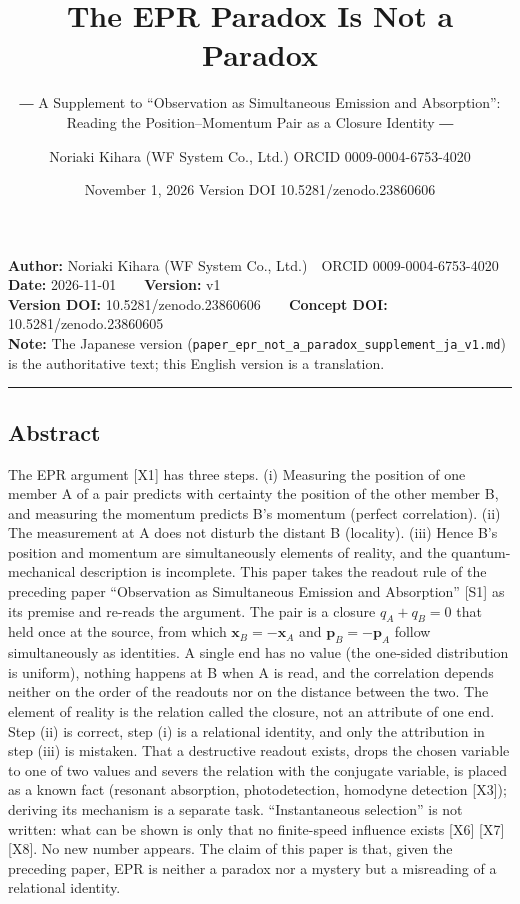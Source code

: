 \documentclass[
  a4paper,
]{article}
\title{The EPR Paradox Is Not a Paradox}
\subtitle{― A Supplement to ``Observation as Simultaneous Emission and
Absorption'': Reading the Position--Momentum Pair as a Closure Identity
―}
\author{Noriaki Kihara (WF System Co., Ltd.) ORCID 0009-0004-6753-4020}
\date{November 1, 2026 Version DOI 10.5281/zenodo.23860606}
\begin{document}
\maketitle

\textbf{Author:} Noriaki Kihara (WF System Co., Ltd.)　ORCID
0009-0004-6753-4020\\
\textbf{Date:} 2026-11-01　　\textbf{Version:} v1\\
\textbf{Version DOI:} 10.5281/zenodo.23860606　　\textbf{Concept DOI:}
10.5281/zenodo.23860605\\
\textbf{Note:} The Japanese version
(\texttt{paper\_\allowbreak{}epr\_\allowbreak{}not\_\allowbreak{}a\_\allowbreak{}paradox\_\allowbreak{}supplement\_\allowbreak{}ja\_\allowbreak{}v1.md}) is the
authoritative text; this English version is a translation.

\begin{center}\rule{0.5\linewidth}{0.5pt}\end{center}

\subsection{Abstract}\label{abstract}

The EPR argument {[}X1{]} has three steps. (i) Measuring the position of
one member A of a pair predicts with certainty the position of the other
member B, and measuring the momentum predicts B's momentum (perfect
correlation). (ii) The measurement at A does not disturb the distant B
(locality). (iii) Hence B's position and momentum are simultaneously
elements of reality, and the quantum-mechanical description is
incomplete. This paper takes the readout rule of the preceding paper
``Observation as Simultaneous Emission and Absorption'' {[}S1{]} as its
premise and re-reads the argument. The pair is a closure \(q_A+q_B=0\)
that held once at the source, from which
\(\boldsymbol{x}_B=-\boldsymbol{x}_A\) and
\(\boldsymbol{p}_B=-\boldsymbol{p}_A\) follow simultaneously as
identities. A single end has no value (the one-sided distribution is
uniform), nothing happens at B when A is read, and the correlation
depends neither on the order of the readouts nor on the distance between
the two. The element of reality is the relation called the closure, not
an attribute of one end. Step (ii) is correct, step (i) is a relational
identity, and only the attribution in step (iii) is mistaken. That a
destructive readout exists, drops the chosen variable to one of two
values and severs the relation with the conjugate variable, is placed as
a known fact (resonant absorption, photodetection, homodyne detection
{[}X3{]}); deriving its mechanism is a separate task. ``Instantaneous
selection'' is not written: what can be shown is only that no
finite-speed influence exists {[}X6{]} {[}X7{]} {[}X8{]}. No new number
appears. The claim of this paper is that, given the preceding paper, EPR
is neither a paradox nor a mystery but a misreading of a relational
identity.
\end{document}
